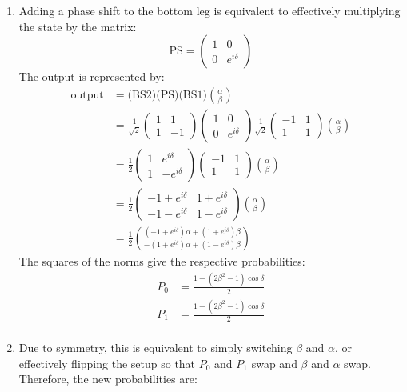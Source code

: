 \begin{sol}
\begin{enumerate}[label=\textbf{(\alph*)}]
\item 
Adding a phase shift to the bottom leg is equivalent to effectively multiplying the state by the matrix:
$$\text{PS} = \begin{pmatrix}
1 & 0 \\
0 & e^{i\delta}
\end{pmatrix}$$
The output is represented by:
\begin{align*}
\text{output} &=\text{(BS2)(PS)(BS1)}\binom{\alpha}{\beta} \\
&=
\frac{1}{\sqrt{2}}
\begin{pmatrix}
1 & 1 \\
1 & -1
\end{pmatrix}
\begin{pmatrix}
1 & 0 \\
0 & e^{i\delta}
\end{pmatrix}
\frac{1}{\sqrt{2}}
\begin{pmatrix}
-1 & 1 \\
1 & 1
\end{pmatrix}
\binom{\alpha}{\beta} \\
&= \frac{1}{2}
\begin{pmatrix}
1 & e^{i\delta} \\
1 & -e^{i \delta}
\end{pmatrix}
\begin{pmatrix}
-1 & 1 \\
1 & 1
\end{pmatrix}
\binom{\alpha}{\beta} \\
&= \frac{1}{2}
\begin{pmatrix}
-1+e^{i\delta} & 1+e^{i\delta}\\
-1-e^{i\delta} & 1-e^{i\delta}
\end{pmatrix}
\binom{\alpha}{\beta} \\
&= \frac{1}{2}
\binom{(-1+e^{i\delta})\alpha+(1+e^{i\delta})\beta}{-(1+e^{i\delta})\alpha+(1-e^{i\delta})\beta}
\end{align*}
The squares of the norms give the respective probabilities:
\begin{align*}
    P_0 &= \frac{1+(2\beta^2-1)\cos\delta}{2} \\
    P_1 &= \frac{1-(2\beta^2-1)\cos\delta}{2} \\
\end{align*}
\item Due to symmetry, this is equivalent to simply switching $\beta$ and $\alpha$, or effectively flipping the setup so that $P_0$ and $P_1$ swap and $\beta$ and $\alpha$ swap. Therefore, the new probabilities are:

\end{enumerate}
\end{sol}
